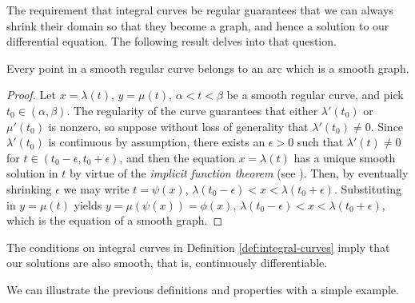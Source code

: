 The requirement that integral curves be regular guarantees that we can always shrink their domain so that they become a graph, and hence a solution to our differential equation. The following result delves into that question.

\begin{prop}
  Every point in a smooth regular curve belongs to an arc which is a smooth graph.
\end{prop}

\begin{proof}
  Let $x=\lambda(t)$, $y=\mu(t)$, $\alpha < t < \beta$ be a smooth regular curve, and pick $t_0 \in (\alpha, \beta)$. The regularity of the curve guarantees that either $\lambda'(t_0)$ or $\mu'(t_0)$ is nonzero, so suppose without loss of generality that $\lambda'(t_0) \neq 0$. Since $\lambda'(t_0)$ is continuous by assumption, there exists an $\epsilon > 0$ such that $\lambda'(t)\neq 0$ for $t \in (t_0 - \epsilon, t_0 + \epsilon)$, and then the equation $x=\lambda(t)$ has a unique smooth solution in $t$ by virtue of the \textit{implicit function theorem} (see \cite[207]{de2000mathematical}). Then, by eventually shrinking $\epsilon$ we may write $t=\psi(x)$, $\lambda(t_0 - \epsilon) < x < \lambda(t_0 + \epsilon)$. Substituting in $y=\mu(t)$ yields $y=\mu(\psi(x)) = \phi(x)$, $\lambda(t_0 - \epsilon) < x < \lambda(t_0 + \epsilon)$, which is the equation of a smooth graph.
\end{proof}

\begin{remark} The conditions on integral curves in Definition \ref{def:integral-curves} imply that our solutions are also smooth, that is, continuously differentiable.
\end{remark}

We can illustrate the previous definitions and properties with a simple example.

